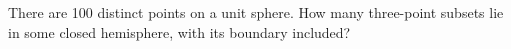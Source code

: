 There are 100 distinct points on a unit sphere. How many three-point subsets lie in some closed hemisphere, with its boundary included?
